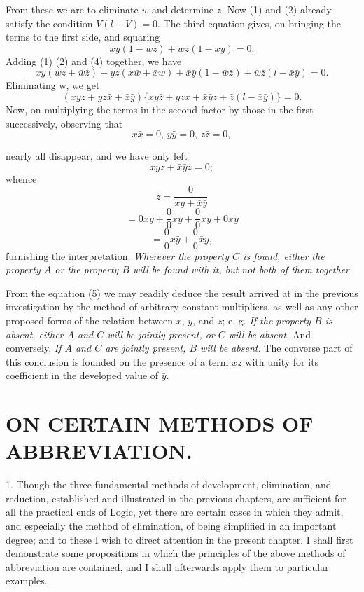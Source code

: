 \documentclass[oneside]{book}
\begin{document}
From these we are to eliminate $w$ and determine $z$. Now (1)
and (2) already satisfy the condition $V(l - V) = 0$. The third
equation gives, on bringing the terms to the first side, and
squaring
\begin{equation}
\bar{x}\bar{y} (1 -\bar{w}\bar{z}) + \bar{w}\bar{z}(1 - \bar{x}\bar{y}) = 0.
\end{equation}
Adding (1) (2) and (4) together, we have
\[
xy(wz + \bar{w}\bar{z}) + yz(x\bar{w} +\bar{x}w)+\bar{x}\bar{y}(1 - \bar{w}\bar{z}) + \bar{w}\bar{z}(l - \bar{x}\bar{y}) = 0.
 \]
Eliminating w, we get
\[
(xyz + yz\bar{x} + \bar{x}\bar{y}) \{xy\bar{z} + yzx + \bar{x}\bar{y}z + \bar{z}(l - \bar{x}\bar{y})\} = 0.
\]
Now, on multiplying the terms in the second factor by those in
the first successively, observing that
\[
x\bar{x} = 0\textrm{, }y\bar{y} = 0\textrm{, }z\bar{z} = 0,
\]

nearly all disappear, and we have only left
\begin{equation}
xyz + \bar{x}\bar{y}z = 0;
\end{equation}
whence
\[
z = \frac{0}{xy+\bar{x}\bar{y}}
\]
\[
= 0xy + \frac{0}{0}x\bar{y} + \frac{0}{0}\bar{x}y + 0\bar{x}\bar{y}
\]
\[
= \frac{0}{0}x\bar{y} + \frac{0}{0}\bar{x}y,
\]
furnishing the interpretation. \textit{Wherever the property $C$ is found,
either the property $A$ or the property $B$ will be found with it, but
not both of them together.}

From the equation (5) we may readily deduce the result arrived
at in the previous investigation by the method of arbitrary
constant multipliers, as well as any other proposed forms of the
relation between $x$, $y$, and $z$; e. g. \textit{If the property $B$ is absent,
either $A$ and $C$ will be jointly present, or $C$ will be absent.} And
conversely, \textit{If $A$ and $C$ are jointly present, $B$ will be absent.}
The converse part of this conclusion is founded on the presence
of a term $xz$ with unity for its coefficient in the developed value
of $\bar{y}$.

\chapter[METHODS OF ABBREVIATION]
{\large ON CERTAIN METHODS OF ABBREVIATION.}

1. Though the three fundamental methods of development,
elimination, and reduction, established and illustrated in
the previous chapters, are sufficient for all the practical ends of
Logic, yet there are certain cases in which they admit, and especially
the method of elimination, of being simplified in an important
degree; and to these I wish to direct attention in the
present chapter. I shall first demonstrate some propositions in
which the principles of the above methods of abbreviation are
contained, and I shall afterwards apply them to particular examples.
\end{document}
